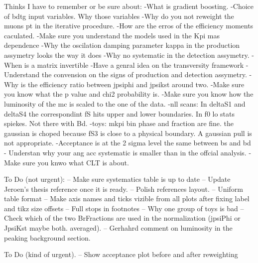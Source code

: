 
Thinks I have to remember or be sure about:
-What is gradient boosting.
-Choice of bdtg input variables. Why those variables
-Why do you not reweight the muons pt in the iterative procedure.
-How are the erros of the efficiency moments caculated.
-Make sure you understand the models used in the Kpi mas dependence
-Why the oscilation damping parameter kappa in the production assymetry looks the way it does 
-Why no systematic in the detection assymetry.
-When is a matrix invertible
-Have a genral idea on the transversity framework
-Understand the convension on the signs of production and detection assymetry.
-Why is the efficiency ratio between jpsiphi and jpsikst around two.
-Make sure you know what the p value and chi2 probability is.
-Make sure you know how the luminosity of the mc is scaled to the one of the data.
-nll scans: 
    In deltaS1 and deltaS4 the correspondint fS hits upper and lower boundaries.
    In f0 lo stats spiekes. Not there with Bd. 
-toys:
    mkpi bin phase and fraction are fine. the gaussian is choped because fS3 is close to a physical boundary. A gaussian pull is not appropriate.
-Acceptance is at the 2 sigma level the same between bs and bd
- Understan why your ang acc systematic is smaller than in the offcial analysis.
- Make sure you knwo what CLT is about.

To Do (not urgent):
-- Make sure systematics table is up to date
-- Update Jeroen's thesis reference once it is ready.
-- Polish references layout.
-- Uniform table format
-- Make axis names and ticks vizible from all plots after fixing label and tikz size offsets
-- Full stops in footnotes
-- Why one group of toys is bad
-- Check which of the two BrFractions are used in the normalization (jpsiPhi or JpsiKst maybe both. averaged).
-- Gerhahrd comment on luminosity in the peaking background section.

To Do (kind of urgent).
-- Show acceptance plot before and after reweighting  


